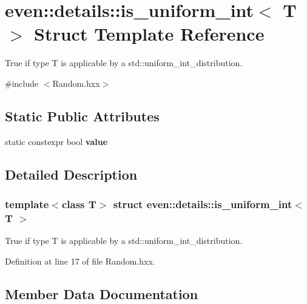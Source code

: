 \hypertarget{structeven_1_1details_1_1is__uniform__int}{}\section{even\+:\+:details\+:\+:is\+\_\+uniform\+\_\+int$<$ T $>$ Struct Template Reference}
\label{structeven_1_1details_1_1is__uniform__int}


True if type T is applicable by a std\+::uniform\+\_\+int\+\_\+distribution.  




{\ttfamily \#include $<$Random.\+hxx$>$}

\subsection*{Static Public Attributes}
\begin{DoxyCompactItemize}
\item 
static constexpr bool {\bfseries value}
\end{DoxyCompactItemize}


\subsection{Detailed Description}
\subsubsection*{template$<$class T$>$\newline
struct even\+::details\+::is\+\_\+uniform\+\_\+int$<$ T $>$}

True if type T is applicable by a std\+::uniform\+\_\+int\+\_\+distribution. 

Definition at line 17 of file Random.\+hxx.



\subsection{Member Data Documentation}
\mbox{\label{structeven_1_1details_1_1is__uniform__int_a53f23396c66649f3137b5cc2678a1d7d}} 
